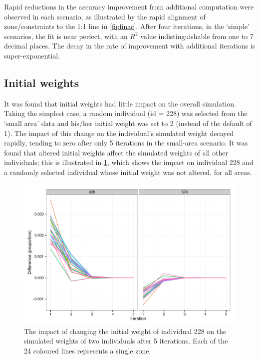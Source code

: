 \documentclass[a4paper,10pt]{article}
\begin{document}
Rapid reductions in the accuracy improvement from
additional computation were observed in each scenario, as illustrated
by the rapid alignment of zone/constraints to the 1:1 line in \cref{fipfinac}.
After four iterations, in the `simple' scenarios,
the fit is near perfect, with an $R^2$ value indistinguishable from one
to 7 decimal places. The decay in the rate of improvement with additional 
iterations is super-exponential. 

\subsection{Initial weights}
It was found that initial weights had little impact on the overall simulation. 
Taking the simplest case, a random individual (id = 228) was selected from the 
`small area' data and his/her initial weight was set to 2 
(instead of the default of 1). The impact of this change on the individual's 
simulated weight decayed rapidly, tending to zero after only 5 iterations in the small-area scenario. 
It was found that altered initial weights affect the simulated weights of all other individuals; 
this is illustrated in \cref{ficweight}, which shows the impact on individual 228 and a randomly selected 
individual whose initial weight was not altered, for all areas.

\begin{figure}
 \begin{center}
  \includegraphics[width=12cm]{weight-1-5-its}
 \end{center}
\caption{The impact of changing the initial weight of individual 228 on the simulated weights of two individuals after 5 iterations. Each of the 24 coloured lines represents a single zone.}
\label{ficweight}
\end{figure}
\end{document}
